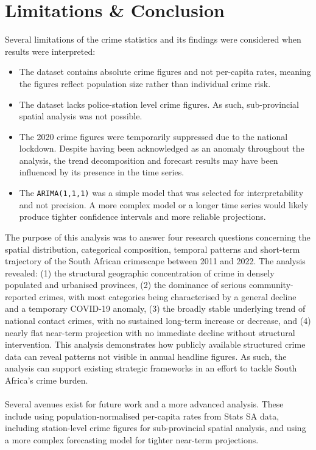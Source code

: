 \documentclass[titlepage, 12pt, oneside]{article}
\begin{document}
\newpage

\section*{Limitations \& Conclusion}
Several limitations of the crime statistics and its findings were considered when results were interpreted:

\begin{itemize}
	\item The dataset contains absolute crime figures and not per-capita
	rates, meaning the figures reflect population size rather than individual crime risk.
	\item The dataset lacks police-station level crime figures. As such, sub-provincial spatial analysis was not possible.
	\item The 2020 crime figures were temporarily suppressed due to the national
	lockdown. Despite having been acknowledged as an anomaly throughout the analysis, the trend decomposition and forecast results may have been influenced by its presence in the time series.
	\item The \texttt{ARIMA(1,1,1)} was a simple model that was selected for
	interpretability and not precision. A more complex model or a longer
	time series would likely produce tighter confidence intervals and more reliable projections.
\end{itemize}

\noindent The purpose of this analysis was to answer four research questions concerning the spatial distribution, categorical composition, temporal patterns and short-term trajectory of the South African crimescape between 2011 and 2022. The analysis revealed: (1) the structural geographic concentration of crime in densely populated and urbanised provinces, (2) the dominance of serious community-reported crimes, with most categories being characterised by a general decline and a temporary COVID-19 anomaly, (3) the broadly stable underlying trend of national contact crimes, with no sustained long-term
increase or decrease, and (4) nearly flat near-term projection with no immediate
decline without structural intervention. This analysis demonstrates how publicly available structured crime data can reveal patterns not visible in annual headline figures. As such, the analysis can support existing strategic frameworks in an effort to tackle South Africa’s crime burden. \\\\
Several avenues exist for future work and a more advanced analysis. These include using population-normalised per-capita rates from Stats SA data, including station-level crime figures for sub-provincial spatial analysis, and using a more complex forecasting model for tighter near-term projections.
	
\end{document}
